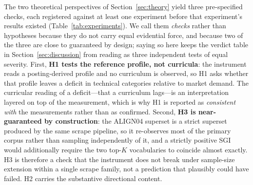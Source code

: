 \documentclass[journal]{IEEEtran}
\begin{document}
The two theoretical perspectives of Section~\ref{sec:theory} yield three pre-specified checks, each registered against at least one experiment before that experiment's results existed (Table~\ref{tab:experiments}). We call them \emph{checks} rather than hypotheses because they do not carry equal evidential force, and because two of the three are close to guaranteed by design; saying so here keeps the verdict table in Section~\ref{sec:discussion} from reading as three independent tests of equal severity. First, \textbf{H1 tests the reference profile, not curricula}: the instrument reads a posting-derived profile and no curriculum is observed, so H1 asks whether that profile leaves a deficit in technical categories relative to market demand. The curricular reading of a deficit---that a curriculum lags---is an interpretation layered on top of the measurement, which is why H1 is reported as \emph{consistent with} the measurements rather than as confirmed. Second, \textbf{H3 is near-guaranteed by construction}: the ALIGN04 superset is a strict superset produced by the same scrape pipeline, so it re-observes most of the primary corpus rather than sampling independently of it, and a strictly positive SGI would additionally require the two top-$K$ vocabularies to coincide almost exactly. H3 is therefore a check that the instrument does not break under sample-size extension within a single scrape family, not a prediction that plausibly could have failed. H2 carries the substantive directional content.
\end{document}
